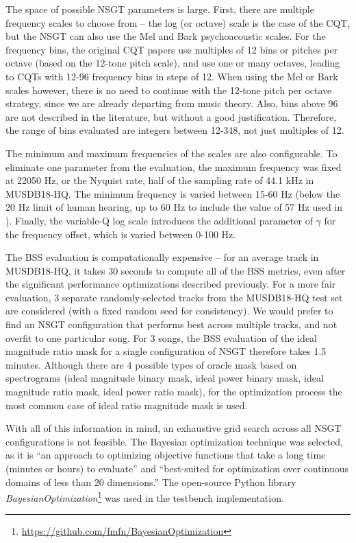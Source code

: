 \documentclass[letter,12pt,notitlepage]{article}
\begin{document}
The space of possible NSGT parameters is large. First, there are multiple frequency scales to choose from -- the log (or octave) scale is the case of the CQT, but the NSGT can also use the Mel and Bark psychoacoustic scales. For the frequency bins, the original CQT papers \cite{klapuricqt, invertiblecqt} use multiples of 12 bins or pitches per octave (based on the 12-tone pitch scale), and use one or many octaves, leading to CQTs with 12-96 frequency bins in steps of 12. When using the Mel or Bark scales however, there is no need to continue with the 12-tone pitch per octave strategy, since we are already departing from music theory. Also, bins above 96 are not described in the literature, but without a good justification. Therefore, the range of bins evaluated are integers between 12-348, not just multiples of 12.

The minimum and maximum frequencies of the scales are also configurable. To eliminate one parameter from the evaluation, the maximum frequency was fixed at 22050 Hz, or the Nyquist rate, half of the sampling rate of 44.1 kHz in MUSDB18-HQ. The minimum frequency is varied between 15-60 Hz (below the 20 Hz limit of human hearing, up to 60 Hz to include the value of 57 Hz used in \cite{klapuricqt}). Finally, the variable-Q log scale introduces the additional parameter of $\gamma$ for the frequency offset, which is varied between 0-100 Hz.

The BSS evaluation is computationally expensive -- for an average track in MUSDB18-HQ, it takes 30 seconds to compute all of the BSS metrics, even after the significant performance optimizations described previously. For a more fair evaluation, 3 separate randomly-selected tracks from the MUSDB18-HQ test set are considered (with a fixed random seed for consistency). We would prefer to find an NSGT configuration that performs best across multiple tracks, and not overfit to one particular song. For 3 songs, the BSS evaluation of the ideal magnitude ratio mask for a single configuration of NSGT therefore takes 1.5 minutes. Although there are 4 possible types of oracle mask based on spectrograms (ideal magnitude binary mask, ideal power binary mask, ideal magnitude ratio mask, ideal power ratio mask), for the optimization process the most common case of ideal ratio magnitude mask is used.

With all of this information in mind, an exhaustive grid search across all NSGT configurations is not feasible. The Bayesian optimization technique \cite{bayesian} was selected, as it is ``an approach to optimizing objective functions that take a long time (minutes or hours) to evaluate'' and ``best-suited for optimization over continuous domains of less than 20 dimensions.'' The open-source Python library \textit{BayesianOptimization}\footnote{\href{https://github.com/fmfn/BayesianOptimization}{https://github.com/fmfn/BayesianOptimization}} was used in the testbench implementation.
\end{document}
